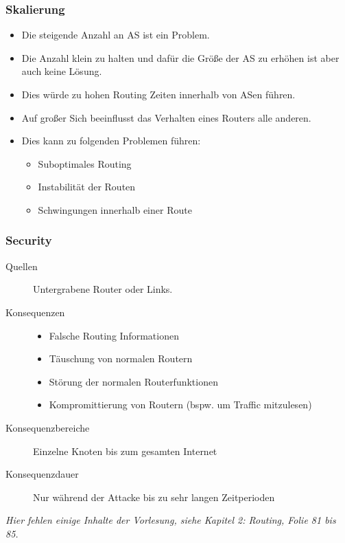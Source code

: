 			\subsubsection{Skalierung}
				\begin{itemize}
					\item Die steigende Anzahl an AS ist ein Problem.
					\item Die Anzahl klein zu halten und dafür die Größe der AS zu erhöhen ist aber auch keine Lösung.
					\item Dies würde zu hohen Routing Zeiten innerhalb von ASen führen.
					\item Auf großer Sich beeinflusst das Verhalten eines Routers alle anderen.
					\item Dies kann zu folgenden Problemen führen:
						\begin{itemize}
							\item Suboptimales Routing
							\item Instabilität der Routen
							\item Schwingungen innerhalb einer Route
						\end{itemize}
				\end{itemize}

			\subsubsection{Security} %
				\begin{description}
					\item[Quellen] Untergrabene Router oder Links.
					\item[Konsequenzen]
						\begin{itemize}
							\item Falsche Routing Informationen
							\item Täuschung von normalen Routern
							\item Störung der normalen Routerfunktionen
							\item Kompromittierung von Routern (bspw. um Traffic mitzulesen)
						\end{itemize}
					\item[Konsequenzbereiche] Einzelne Knoten bis zum gesamten Internet
					\item[Konsequenzdauer] Nur während der Attacke bis zu sehr langen Zeitperioden
				\end{description}

				\textit{Hier fehlen einige Inhalte der Vorlesung, siehe Kapitel 2: Routing, Folie 81 bis 85.}

